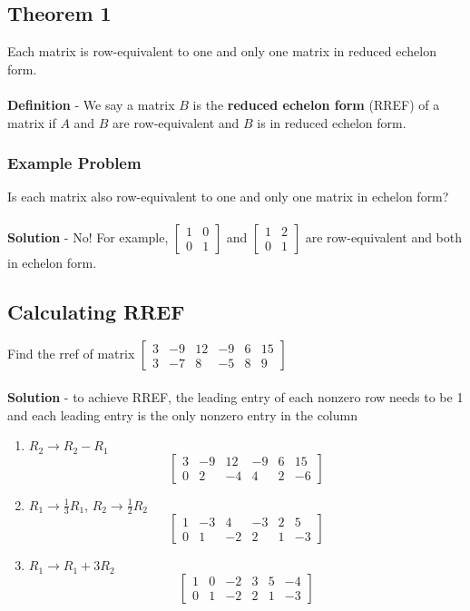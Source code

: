 \subsection{Theorem 1}
Each matrix is row-equivalent to one and only one matrix in reduced echelon form. \\\\ 
\textbf{Definition} - We say a matrix $B$ is the \textbf{reduced echelon form} (RREF) of a matrix if $A$ and $B$ are row-equivalent and $B$ is in reduced echelon form.
\subsubsection{Example Problem}
Is each matrix also row-equivalent to one and only one matrix in echelon form? \\\\
\textbf{Solution} - No! For example, $\begin{bmatrix}
  1 & 0 \\
  0 & 1
\end{bmatrix}$ and $\begin{bmatrix}
  1 & 2 \\
  0 & 1
\end{bmatrix}$ are row-equivalent and both in echelon form.
\subsection{Calculating RREF}
Find the rref of matrix $\begin{bmatrix}
  3 & -9 & 12 & -9 & 6 & 15 \\
  3 & -7 & 8 & -5 & 8 & 9
\end{bmatrix}$ \\\\
\textbf{Solution} - to achieve RREF, the leading entry of each nonzero row needs to be 1 and each leading entry is the only nonzero entry in the column 
\begin{enumerate}
  \item $R_2 \rightarrow R_2 - R_1$
    \[
      \begin{bmatrix}
        3 & -9 & 12 & -9 & 6 & 15 \\
        0 & 2 & -4 & 4 & 2 & -6
      \end{bmatrix}
    \]
  \item $R_1 \rightarrow \frac{1}{3}R_1$, $R_2 \rightarrow \frac{1}{2}R_2$
    \[
      \begin{bmatrix}
        1 & -3 & 4 & -3 & 2 & 5 \\
        0 & 1 & -2 & 2 & 1 & -3
      \end{bmatrix}
    \]
  \item $R_1 \rightarrow R_1 + 3R_2$
    \[
      \begin{bmatrix}
        1 & 0 & -2 & 3 & 5 & -4 \\
        0 & 1 & -2 & 2 & 1 & -3
      \end{bmatrix}
    \]
\end{enumerate} \\\\
